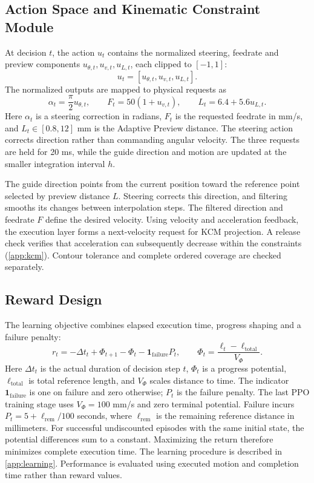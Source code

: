 \documentclass[preprint,12pt]{elsarticle}
\begin{document}
\subsection{Action Space and Kinematic Constraint Module}
At decision $t$, the action $u_t$ contains the normalized steering, feedrate and preview components $u_{\theta,t},u_{v,t},u_{L,t}$, each clipped to $[-1,1]$:
\begin{equation}
u_t=[u_{\theta,t},u_{v,t},u_{L,t}].
\end{equation}
The normalized outputs are mapped to physical requests as
\begin{equation}
\alpha_t=\frac{\pi}{2}u_{\theta,t},\qquad
F_t=50(1+u_{v,t}),\qquad
L_t=6.4+5.6u_{L,t}.
\label{eq:decode}
\end{equation}
Here $\alpha_t$ is a steering correction in radians, $F_t$ is the requested feedrate in mm/s, and $L_t\in[0.8,12]$ mm is the Adaptive Preview distance. The steering action corrects direction rather than commanding angular velocity. The three requests are held for 20 ms, while the guide direction and motion are updated at the smaller integration interval $h$.

The guide direction points from the current position toward the reference point selected by preview distance $L$. Steering corrects this direction, and filtering smooths its changes between interpolation steps. The filtered direction and feedrate $F$ define the desired velocity. Using velocity and acceleration feedback, the execution layer forms a next-velocity request for KCM projection. A release check verifies that acceleration can subsequently decrease within the constraints (\ref{app:kcm}). Contour tolerance and complete ordered coverage are checked separately.

\subsection{Reward Design}
The learning objective combines elapsed execution time, progress shaping and a failure penalty:
\begin{equation}
r_t=-\Delta t_t+\Phi_{t+1}-\Phi_t-\mathbf{1}_{\mathrm{failure}}P_t,
\qquad \Phi_t=\frac{\ell_t-\ell_{\mathrm{total}}}{V_\Phi}.
\label{eq:reward_total}
\end{equation}
Here $\Delta t_t$ is the actual duration of decision step $t$, $\Phi_t$ is a progress potential, $\ell_{\mathrm{total}}$ is total reference length, and $V_\Phi$ scales distance to time. The indicator $\mathbf{1}_{\mathrm{failure}}$ is one on failure and zero otherwise; $P_t$ is the failure penalty. The last PPO training stage uses $V_\Phi=100$ mm/s and zero terminal potential. Failure incurs $P_t=5+\ell_{\mathrm{rem}}/100$ seconds, where $\ell_{\mathrm{rem}}$ is the remaining reference distance in millimeters. For successful undiscounted episodes with the same initial state, the potential differences sum to a constant. Maximizing the return therefore minimizes complete execution time. The learning procedure is described in \ref{app:learning}. Performance is evaluated using executed motion and completion time rather than reward values.
\end{document}
